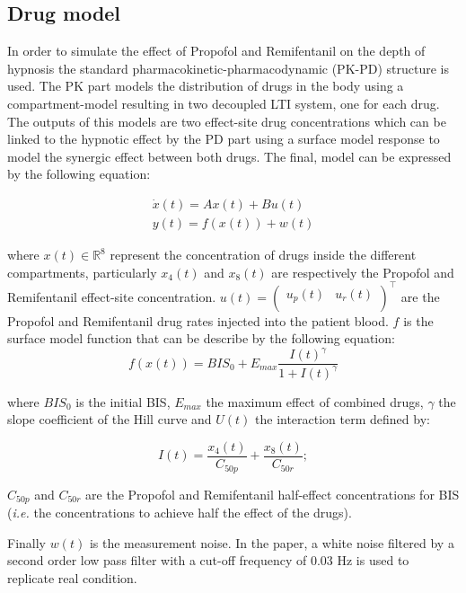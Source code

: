 \subsection{Drug model}
In order to simulate the effect of Propofol and Remifentanil on the depth of hypnosis the standard pharmacokinetic-pharmacodynamic (PK-PD) structure is used. The PK part models the distribution of drugs in the body using a compartment-model resulting in two decoupled LTI system, one for each drug. The outputs of this models are two effect-site drug concentrations which can be linked to the hypnotic effect by the PD part using a surface model response to model the synergic effect between both drugs. The final, model can be expressed by the following equation:

\begin{equation}
\begin{array}{ll}
        \dot{x}(t) = A x(t) + B u(t)\\
        y(t) = f(x(t)) + w(t)
    \end{array}
\label{eq:model}
\end{equation}

where $x(t) \in \mathbb{R} ^8$ represent the concentration of drugs inside the different compartments, particularly $x_4(t)$ and $x_8(t)$ are respectively the Propofol and Remifentanil effect-site concentration. $u(t)=\begin{pmatrix}
u_p(t) & u_r(t) \\
\end{pmatrix}^\top$ are the Propofol and Remifentanil drug rates injected into the patient blood. $f$ is the surface model function that can be describe by the following equation:
\begin{equation}
	f(x(t)) = BIS_0 + E_{max} \frac{I(t)^\gamma}{1 + I(t)^\gamma}
\end{equation}

where $BIS_0$ is the initial BIS, $E_{max}$ the maximum effect of combined drugs, $\gamma$ the slope coefficient of the Hill curve and $U(t)$ the interaction term defined by:

\begin{equation}
I(t) = \frac{x_{4}(t)}{C_{50p}} + \frac{x_{8}(t)}{C_{50r}}; 
\end{equation}

$C_{50p}$ and $C_{50r}$ are the Propofol and Remifentanil half-effect concentrations for BIS ({\em i.e.} the concentrations to achieve half the effect of the drugs).

Finally $w(t)$ is the measurement noise. In the paper, a white noise filtered by a second order low pass filter with a cut-off frequency of 0.03 Hz is used to replicate real condition.\\

